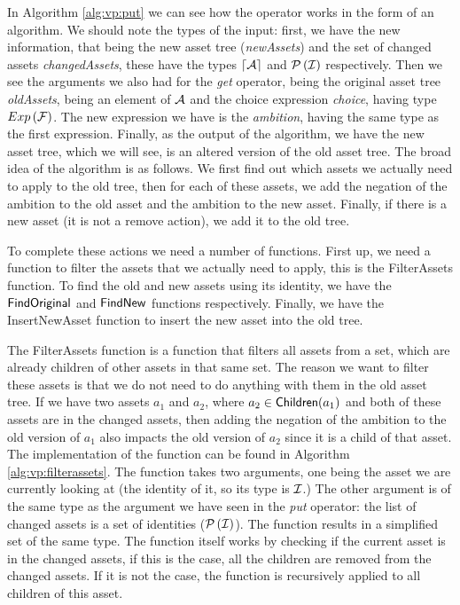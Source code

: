 In Algorithm \ref{alg:vp:put} we can see how the operator works in the form of
an algorithm. We should note the types of the input: first, we have the new 
information, that being the new asset tree (\textit{newAssets}) and the set of
changed assets \textit{changedAssets}, these have the types 
\(\lceil \mathcal{A} \rceil\) and \(\mathcal{P} \left(\mathcal{I}\right)\) respectively. Then
we see the arguments we also had for the \emph{get} operator, being the
original asset tree \textit{oldAssets}, being an element of \(\mathcal{A}\) and
the choice expression \textit{choice}, having type \(Exp \left( \mathcal{F} \right)\).
The new expression we have is the \textit{ambition}, having the same type as
the first expression. Finally, as the output of the algorithm, we have the new
asset tree, which we will see, is an altered version of the old asset tree.
The broad idea of the algorithm is as follows. We first find out which assets
we actually need to apply to the old tree, then for each of these assets, we
add the negation of the ambition to the old asset and the ambition to the new
asset. Finally, if there is a new asset (it is not a remove action), we add it
to the old tree. 

To complete these actions we need a number of functions. First up, we need a
function to filter the assets that we actually need to apply, this is the
{\sc FilterAssets} function. To find the old and new assets using its identity,
we have the \({\sf FindOriginal}\) and \({\sf FindNew}\) functions respectively.
Finally, we have the {\sc InsertNewAsset} function to insert the new asset into
the old tree.

The {\sc FilterAssets} function is a function that filters all assets from a
set, which are already children of other assets in that same set. The reason
we want to filter these assets is that we do not need to do anything with
them in the old asset tree. If we have two assets \(a_1\) and \(a_2\), where
\(a_2 \in {\sf Children}(a_1)\) and both of these assets are in the changed
assets, then adding the negation of the ambition to the old version of \(a_1\)
also impacts the old version of \(a_2\) since it is a child of that asset. The
implementation of the function can be found in Algorithm
\ref{alg:vp:filterassets}. The function takes two arguments, one being the
asset we are currently looking at (the identity of it, so its type is
\(\mathcal{I}\).) The other argument is of the same type as the argument we
have seen in the \emph{put} operator: the list of changed assets is a set of
identities (\(\mathcal{P} \left(\mathcal{I}\right)\)). The function results in a
simplified set of the same type. The function itself works by checking if the
current asset is in the changed assets, if this is the case, all the children
are removed from the changed assets. If it is not the case, the function is
recursively applied to all children of this asset.

